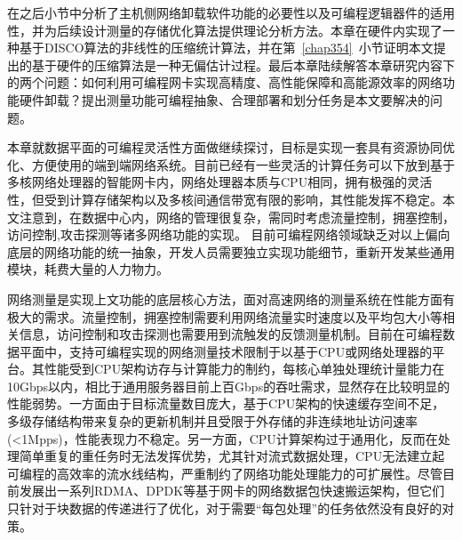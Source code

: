 在之后小节中分析了主机侧网络卸载软件功能的必要性以及可编程逻辑器件的适用性，并为后续设计测量的存储优化算法提供理论分析方法。本章在硬件内实现了一种基于DISCO算法的非线性的压缩统计算法，并在第~\ref{chap354}~小节证明本文提出的基于硬件的压缩算法是一种无偏估计过程。最后本章陆续解答本章研究内容下的两个问题：如何利用可编程网卡实现高精度、高性能保障和高能源效率的网络功能硬件卸载？提出测量功能可编程抽象、合理部署和划分任务是本文要解决的问题。





\label{chap32}





本章就数据平面的可编程灵活性方面做继续探讨，目标是实现一套具有资源协同优化、方便使用的端到端网络系统。目前已经有一些灵活的计算任务可以下放到基于多核网络处理器的智能网卡内，网络处理器本质与CPU相同，拥有极强的灵活性，但受到计算存储架构以及多核间通信带宽有限的影响，其性能发挥不稳定。本文注意到，在数据中心内，网络的管理很复杂，需同时考虑流量控制，拥塞控制，访问控制,攻击探测等诸多网络功能的实现。
目前可编程网络领域缺乏对以上偏向底层的网络功能的统一抽象，开发人员需要独立实现功能细节，重新开发某些通用模块，耗费大量的人力物力。



网络测量是实现上文功能的底层核心方法，面对高速网络的测量系统在性能方面有极大的需求。流量控制，拥塞控制需要利用网络流量实时速度以及平均包大小等相关信息，访问控制和攻击探测也需要用到流触发的反馈测量机制。目前在可编程数据平面中，支持可编程实现的网络测量技术限制于以基于CPU或网络处理器的平台。其性能受到CPU架构访存与计算能力的制约，每核心单独处理统计量能力在10Gbps以内，相比于通用服务器目前上百Gbps的吞吐需求，显然存在比较明显的性能弱势。一方面由于目标流量数目庞大，基于CPU架构的快速缓存空间不足，多级存储结构带来复杂的更新机制并且受限于外存储的非连续地址访问速率(<1Mpps)，性能表现力不稳定。另一方面，CPU计算架构过于通用化，反而在处理简单重复的重任务时无法发挥优势，尤其针对流式数据处理，CPU无法建立起可编程的高效率的流水线结构，严重制约了网络功能处理能力的可扩展性。尽管目前发展出一系列RDMA、DPDK等基于网卡的网络数据包快速搬运架构，但它们只针对于块数据的传递进行了优化，对于需要“每包处理”的任务依然没有良好的对策。

